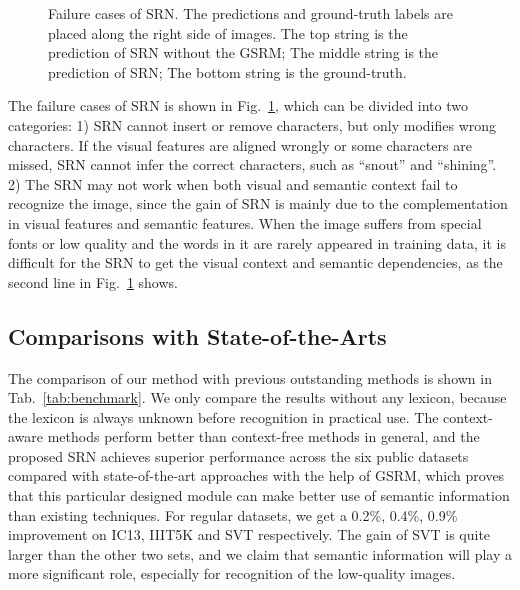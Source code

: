\documentclass[10pt,twocolumn,letterpaper]{article}
\begin{document}
\begin{CJK}{UTF8}{gbsn}
\begin{figure}[htp]
\begin{center}
  \caption{ Failure cases of SRN.
The predictions and ground-truth labels are placed along the right side of images. 
The top string is the prediction of SRN without the GSRM;
The middle string is the prediction of SRN;
The bottom string is the ground-truth.
  }
  \label{fig:bad-case} 
\end{center}
\vspace{-8mm}
\end{figure}

The failure cases of SRN is shown in Fig.~\ref{fig:bad-case}, which can be divided into two categories: 1) SRN cannot insert or remove characters, but only modifies wrong characters. If the visual features are aligned wrongly or some characters are missed, SRN cannot infer the correct characters, such as “snout” and “shining”. 
2) The SRN may not work when both visual and semantic context fail to recognize the image, since the gain of SRN is mainly due to the complementation in visual features and semantic features.
When the image suffers from special fonts or low quality and the words in it are rarely appeared in training data, it is difficult for the SRN to get the visual context and semantic dependencies, as the second line in Fig.~\ref{fig:bad-case} shows.

\subsection{Comparisons with State-of-the-Arts}\label{sec:Comparsion_on_Benchmark}
The comparison of our method with previous outstanding methods is shown in Tab.~\ref{tab:benchmark}. We only compare the results without any lexicon, because the lexicon is always unknown before recognition in practical use. The context-aware methods perform better than context-free methods in general, and the proposed SRN achieves superior performance across the six public datasets compared with state-of-the-art approaches with the help of GSRM, which proves that this particular designed module can make better use of semantic information than existing techniques. For regular datasets, we get a 0.2\%, 0.4\%, 0.9\% improvement on IC13, IIIT5K and SVT respectively. The gain of SVT is quite larger than the other two sets, and we claim that semantic information will play a more significant role, especially for recognition of the low-quality images.


\end{CJK}
\end{document}
